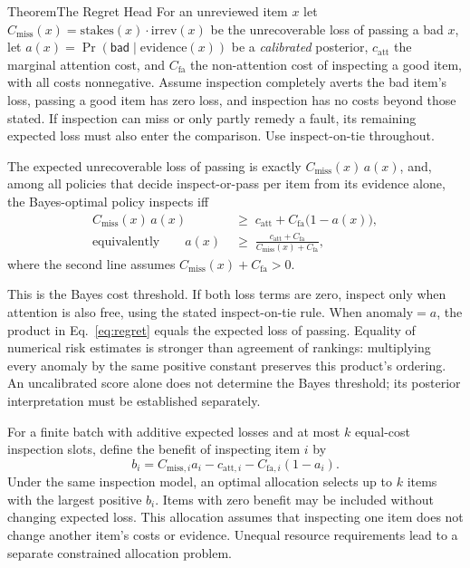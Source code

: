 \documentclass[11pt,a4paper]{article}
\theoremstyle{definition}
\theoremstyle{plain}
\begin{document}
\begin{pdclaim}{Theorem}{The Regret Head}
\setlength{\parskip}{4pt plus 1pt}
\label{thm:regret-head}
For an unreviewed item $x$ let $C_{\mathrm{miss}}(x)=\mathrm{stakes}(x)\cdot
\mathrm{irrev}(x)$ be the unrecoverable loss of passing a bad $x$, let
$a(x)=\Pr(\mathsf{bad}\mid\text{evidence}(x))$ be a \emph{calibrated} posterior,
$c_{\mathrm{att}}$ the marginal attention cost, and $C_{\mathrm{fa}}$ the
non-attention cost of inspecting a good item, with all costs nonnegative.
Assume inspection completely averts the bad item's loss, passing a good item
has zero loss, and inspection has no costs beyond those stated. If inspection
can miss or only partly remedy a fault, its remaining expected loss must also
enter the comparison. Use inspect-on-tie throughout.

The expected unrecoverable loss of
passing is exactly $C_{\mathrm{miss}}(x)\,a(x)$, and, among all policies that
decide inspect-or-pass per item from its evidence alone, the Bayes-optimal policy
inspects iff
\begin{equation}\label{eq:bayes-regret}
\begin{aligned}
C_{\mathrm{miss}}(x)\,a(x)&\;\ge\;c_{\mathrm{att}}+C_{\mathrm{fa}}\bigl(1-a(x)\bigr),\\
\text{equivalently}\qquad
a(x)&\;\ge\;\frac{c_{\mathrm{att}}+C_{\mathrm{fa}}}
 {C_{\mathrm{miss}}(x)+C_{\mathrm{fa}}},
\end{aligned}
\end{equation}
where the second line assumes $C_{\mathrm{miss}}(x)+C_{\mathrm{fa}}>0$.

This is the Bayes cost threshold. If both loss terms are zero, inspect only
when attention is also free, using the stated inspect-on-tie rule. When
$\mathrm{anomaly}=a$, the product in Eq.~\ref{eq:regret} equals the expected
loss of passing. Equality of numerical risk estimates is stronger than
agreement of rankings: multiplying every anomaly by the same positive
constant preserves this product's ordering. An uncalibrated score alone does
not determine the Bayes threshold; its posterior interpretation must be
established separately.

For a finite batch with additive expected losses and at most $k$ equal-cost
inspection slots, define the benefit of inspecting item $i$ by
\[
  b_i=C_{\mathrm{miss},i}a_i-c_{\mathrm{att},i}
       -C_{\mathrm{fa},i}(1-a_i).
\]
Under the same inspection model, an optimal allocation selects up to $k$
items with the largest positive $b_i$. Items with zero benefit may be included
without changing expected loss. This allocation assumes that inspecting one
item does not change another item's costs or evidence. Unequal resource
requirements lead to a separate constrained allocation problem.
\end{pdclaim}
\end{document}

